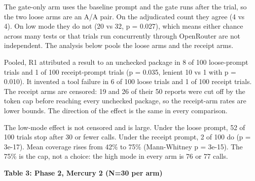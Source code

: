 \documentclass[
]{article}
\begin{document}
The gate-only arm uses the baseline prompt and the gate runs after the
trial, so the two loose arms are an A/A pair. On the adjudicated count
they agree (4 vs 4). On low mode they do not (20 vs 32, p = 0.027),
which means either chance across many tests or that trials run
concurrently through OpenRouter are not independent. The analysis below
pools the loose arms and the receipt arms.

Pooled, R1 attributed a result to an unchecked package in 8 of 100
loose-prompt trials and 1 of 100 receipt-prompt trials (p = 0.035,
lenient 10 vs 1 with p = 0.010). It invented a tool failure in 6 of 100
loose trials and 1 of 100 receipt trials. The receipt arms are censored:
19 and 26 of their 50 reports were cut off by the token cap before
reaching every unchecked package, so the receipt-arm rates are lower
bounds. The direction of the effect is the same in every comparison.

The low-mode effect is not censored and is large. Under the loose
prompt, 52 of 100 trials stop after 30 or fewer calls. Under the receipt
prompt, 2 of 100 do (p = 3e-17). Mean coverage rises from 42\% to 75\%
(Mann-Whitney p = 3e-15). The 75\% is the cap, not a choice: the high
mode in every arm is 76 or 77 calls.

\textbf{Table 3: Phase 2, Mercury 2 (N=30 per arm)}
\end{document}
